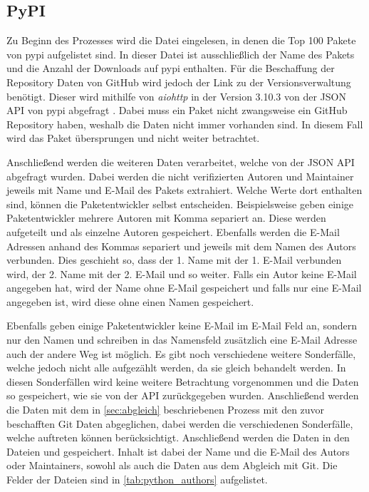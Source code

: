 \subsection{PyPI}
\label{subsec:datenbeschaffung_pypi}
Zu Beginn des Prozesses wird die Datei eingelesen, in denen die Top 100 Pakete von \gls{pypi} aufgelistet sind.
In dieser Datei ist ausschließlich der Name des Pakets und die Anzahl der Downloads auf \gls{pypi} enthalten.
Für die Beschaffung der Repository Daten von GitHub wird jedoch der Link zu der Versionsverwaltung benötigt.
Dieser wird mithilfe von \emph{aiohttp} in der Version 3.10.3 von der JSON API von \gls{pypi} abgefragt \autocite{noauthor_aio-libsaiohttp_2024}.
Dabei muss ein Paket nicht zwangsweise ein GitHub Repository haben, weshalb die Daten nicht immer vorhanden sind.
In diesem Fall wird das Paket übersprungen und nicht weiter betrachtet.

Anschließend werden die weiteren Daten verarbeitet, welche von der JSON API abgefragt wurden.
Dabei werden die nicht verifizierten Autoren und Maintainer jeweils mit Name und E-Mail des Pakets extrahiert.
Welche Werte dort enthalten sind, können die Paketentwickler selbst entscheiden.
Beispielsweise geben einige Paketentwickler mehrere Autoren mit Komma separiert an.
Diese werden aufgeteilt und als einzelne Autoren gespeichert.
Ebenfalls werden die E-Mail Adressen anhand des Kommas separiert und jeweils mit dem Namen des Autors verbunden.
Dies geschieht so, dass der 1. Name mit der 1. E-Mail verbunden wird, der 2. Name mit der 2. E-Mail und so weiter.
Falls ein Autor keine E-Mail angegeben hat, wird der Name ohne E-Mail gespeichert und falls nur eine E-Mail angegeben ist, wird diese ohne einen Namen gespeichert.

Ebenfalls geben einige Paketentwickler keine E-Mail im E-Mail Feld an, sondern nur den Namen und schreiben in das Namensfeld zusätzlich eine E-Mail Adresse auch der andere Weg ist möglich.
Es gibt noch verschiedene weitere Sonderfälle, welche jedoch nicht alle aufgezählt werden, da sie gleich behandelt werden.
In diesen Sonderfällen wird keine weitere Betrachtung vorgenommen und die Daten so gespeichert, wie sie von der API zurückgegeben wurden.
Anschließend werden die Daten mit dem in \autoref{sec:abgleich} beschriebenen Prozess mit den zuvor beschafften Git Daten abgeglichen, dabei werden die verschiedenen Sonderfälle, welche auftreten können berücksichtigt.
Anschließend werden die Daten in den Dateien  und  gespeichert.
Inhalt ist dabei der Name und die E-Mail des Autors oder Maintainers, sowohl als auch die Daten aus dem Abgleich mit Git.
Die Felder der Dateien sind in \autoref{tab:python_authors} aufgelistet.

